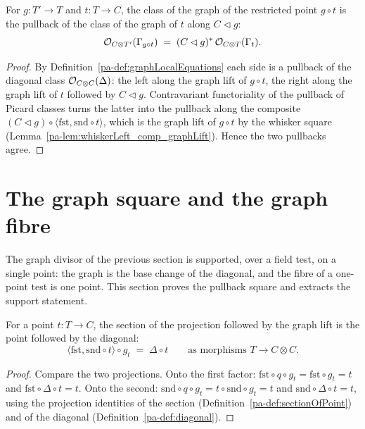 \begin{theorem}
  \label{pa-thm:graphLocalEquations_base_change}
  \leanok

  For \(g \colon T' \to T\) and \(t \colon T \to C\), the class of the graph of the restricted
  point \(g \circ t\) is the pullback of the class of the graph of \(t\) along \(C \lhd g\):
  \[
    \mathcal{O}_{C \otimes T'}(\Gamma_{g \circ t})
      \;=\; (C \lhd g)^{*}\,\mathcal{O}_{C \otimes T}(\Gamma_t).
  \]
\end{theorem}
\begin{proof}
  \leanok
  By Definition~\ref{pa-def:graphLocalEquations} each side is a pullback of the diagonal class
  \(\mathcal{O}_{C \otimes C}(\Delta)\): the left along the graph lift of \(g \circ t\), the right along
  the graph lift of \(t\) followed by \(C \lhd g\). Contravariant functoriality of the pullback of
  Picard classes turns the latter into the pullback along the composite \((C \lhd g) \circ
  \langle\mathrm{fst}, \mathrm{snd} \circ t\rangle\), which is the graph lift of \(g \circ t\) by
  the whisker square (Lemma~\ref{pa-lem:whiskerLeft_comp_graphLift}). Hence the two pullbacks agree.
\end{proof}

\section{The graph square and the graph fibre}
\label{pa-sec:graphFibre}

The graph divisor of the previous section is supported, over a field test, on a single
point: the graph is the base change of the diagonal, and the fibre of a one-point test is
one point. This section proves the pullback square and extracts the support statement.

\begin{lemma}
  \label{pa-lem:sectionOfPoint_comp_graphLift}
  \leanok

  For a point \(t \colon T \to C\), the section of the projection followed by the graph
  lift is the point followed by the diagonal:
  \[
    \langle \mathrm{fst}, \mathrm{snd} \circ t\rangle \circ g_t
      \;=\; \Delta \circ t
    \qquad\text{as morphisms } T \to C \otimes C .
  \]
\end{lemma}
\begin{proof}
  \leanok
  Compare the two projections. Onto the first factor: \(\mathrm{fst} \circ q \circ g_t =
  \mathrm{fst} \circ g_t = t\) and \(\mathrm{fst} \circ \Delta \circ t = t\). Onto the
  second: \(\mathrm{snd} \circ q \circ g_t = t \circ \mathrm{snd} \circ g_t = t\) and
  \(\mathrm{snd} \circ \Delta \circ t = t\), using the projection identities of the section
  (Definition~\ref{pa-def:sectionOfPoint}) and of the diagonal (Definition~\ref{pa-def:diagonal}).
\end{proof}

